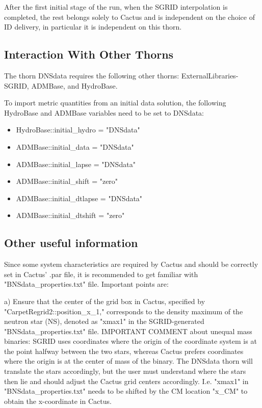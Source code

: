 After the first initial stage of the run, when the SGRID interpolation is
completed, the rest belongs solely to Cactus and is independent on the
choice of ID delivery, in particular it is independent on this thorn.


\subsection{Interaction With Other Thorns}

The thorn DNSdata requires the following other thorns:
ExternalLibraries-SGRID, ADMBase, and HydroBase.

To import metric quantities from an initial data solution, the following
HydroBase and ADMBase variables need to be set to DNSdata:
\begin{itemize}
\item HydroBase::initial\_hydro          = "DNSdata"
\item ADMBase::initial\_data             = "DNSdata"
\item ADMBase::initial\_lapse            = "DNSdata"
\item ADMBase::initial\_shift            = "zero"
\item ADMBase::initial\_dtlapse          = "DNSdata"
\item ADMBase::initial\_dtshift          = "zero"
\end{itemize}

\subsection{Other useful information}

Since some system characteristics are required by Cactus and should be
correctly set in Cactus' .par file, it is recommended to get familiar with
"BNSdata\_properties.txt" file. Important points are:

a) Ensure that the center of the grid box in Cactus, specified by
"CarpetRegrid2::position\_x\_1," corresponds to the density maximum of the
neutron star (NS), denoted as "xmax1" in the SGRID-generated
"BNSdata\_properties.txt" file. IMPORTANT COMMENT about unequal mass
binaries: SGRID uses coordinates where the origin of the coordinate system
is at the point halfway between the two stars, whereas Cactus prefers
coordinates where the origin is at the center of mass of the binary. The
DNSdata thorn will translate the stars accordingly, but the user must
understand where the stars then lie and should adjust the Cactus grid
centers accordingly. I.e. "xmax1" in "BNSdata\_properties.txt" needs to be
shifted by the CM location "x\_CM" to obtain the x-coordinate in Cactus.

